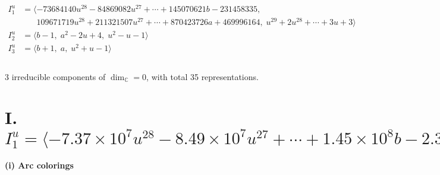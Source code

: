 \documentclass[1p]{elsarticle_modified}
\theoremstyle{definition}
\begin{document}
\begin{align*}
I^u_{1}&=\langle 
-73684140 u^{28}-84869082 u^{27}+\cdots+145070621 b-231458335,\\
\phantom{I^u_{1}}&\phantom{= \langle  }109671719 u^{28}+211321507 u^{27}+\cdots+870423726 a+469996164,\;u^{29}+2 u^{28}+\cdots+3 u+3\rangle \\
I^u_{2}&=\langle 
b-1,\;a^2-2 u+4,\;u^2- u-1\rangle \\
I^u_{3}&=\langle 
b+1,\;a,\;u^2+u-1\rangle \\
\\
\end{align*}
\raggedright * 3 irreducible components of $\dim_{\mathbb{C}}=0$, with total 35 representations.\\
\newpage
\renewcommand{\arraystretch}{1}
\centering \section*{I. $I^u_{1}= \langle -7.37\times10^{7} u^{28}-8.49\times10^{7} u^{27}+\cdots+1.45\times10^{8} b-2.31\times10^{8},\;1.10\times10^{8} u^{28}+2.11\times10^{8} u^{27}+\cdots+8.70\times10^{8} a+4.70\times10^{8},\;u^{29}+2 u^{28}+\cdots+3 u+3 \rangle$}
\flushleft \textbf{(i) Arc colorings}\\
\end{document}
